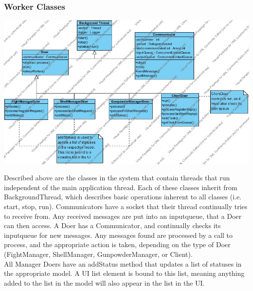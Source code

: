\documentclass[12pt]{article}
\begin{document}
			\subsubsection{Worker Classes}
				\begin{center}
					\includegraphics[width=\textwidth]{Diagrams/Structure Diagrams/ThreadingStructure.jpg}
				\end{center}
				\indent Described above are the classes in the system that contain threads that run independent of the main application thread. Each of these classes inherit from BackgroundThread, which describes basic operations inherent to all classes (i.e. start, stop, run). Communicators have a socket that their thread continually tries to receive from. Any received messages are put into an inputqueue, that a Doer can then access. A Doer has a Communicator, and continually checks its inputqueue for new messages. Any messages found are processed by a call to process, and the appropriate action is taken, depending on the type of Doer (FightManager, ShellManager, GunpowderManager, or Client).\\
				All Manager Doers have an addStatus method that updates a list of statuses in the appropriate model. A UI list element is bound to this list, meaning anything added to the list in the model will also appear in the list in the UI.
\end{document}
